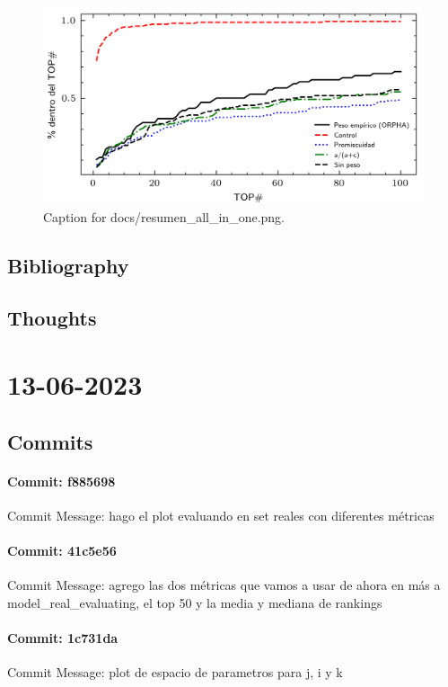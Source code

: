 \documentclass{article}
\begin{document}
\begin{figure}[h] \centering \includegraphics{docs/resumen_all_in_one.png} \caption{Caption for docs/resumen_all_in_one.png.} \end{figure}
\subsection{Bibliography}
\subsection{Thoughts}

\section{13-06-2023}
\subsection{Commits}
\paragraph{Commit: f885698}
Commit Message: hago el plot evaluando en set reales con diferentes métricas

\paragraph{Commit: 41c5e56}
Commit Message: agrego las dos métricas que vamos a usar de ahora en más a model_real_evaluating, el top 50 y la media y mediana de rankings

\paragraph{Commit: 1c731da}
Commit Message: plot de espacio de parametros para j, i y k
\end{document}
